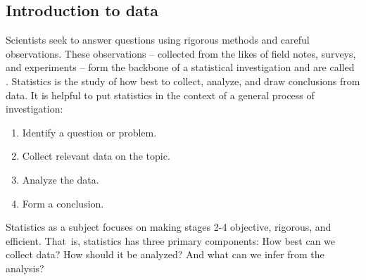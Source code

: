 \begin{doublespace}

\chapter{Introduction to data}
\label{introductionToData}


Scientists seek to answer questions using rigorous methods and careful observations. These observations -- collected from the likes of field notes, surveys, and experiments -- form the backbone of a statistical investigation and are called . Statistics is the study of how best to collect, analyze, and draw conclusions from data. It is helpful to put statistics in the context of a general process of investigation:
\begin{enumerate}
\setlength{\itemsep}{0mm}
\item Identify a question or problem.
\item Collect relevant data on the topic.
\item Analyze the data.
\item Form a conclusion.
\end{enumerate}
Statistics as a subject focuses on making stages 2-4 objective, rigorous, and efficient. That~is, statistics has three primary components: How best can we collect data? How should it be analyzed? And what can we infer from the analysis?  


\end{doublespace}
